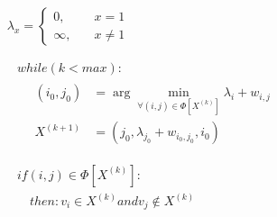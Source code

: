 \begin{equation}
\begin{aligned}
  & \begin{aligned}
  \lambda_x=
\left \{ 
  \begin{aligned}
 0,\quad &x=1 \\ 
 \infty,\quad&x\neq 1
  \end{aligned}
\right. \\ 
  \end{aligned}\\
  & \begin{aligned}
  & while(k<max):\\
  & \quad \begin{aligned}
   (i_0,j_0) &= \arg\min_{\forall(i,j)\in \Phi [X^{(k)}]} \lambda_i + w_{i,j}\\
   X^{(k+1)} &= (j_0,\lambda_{j_0}+w_{i_0,j_0},i_0)\\
  \end{aligned}
  \end{aligned}\\
  & \begin{aligned}
  &if (i,j) \in \Phi [X^{(k)}]:\\
  &\quad then:v_{i} \in X^{(k)} and v_{j} \notin X^{(k)}
\end{aligned}
\end{aligned}
\end{equation}
